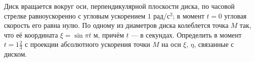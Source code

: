 Диск вращается вокруг оси, перпендикулярной плоскости диска,
по часовой стрелке равноускоренно с угловым ускорением $1$ рад/с$^2$;
в момент $t = 0$ угловая скорость его равна нулю.
По одному из диаметров диска колеблется точка $M$ так,
что её координата $\xi = \sin{\pi t}$ м, причём $t$ --- в секундах.
Определить в момент $t = 1\frac{2}{3}$ с
проекции абсолютного ускорения точки $M$
на оси $\xi$, $\eta$, связанные с диском.
